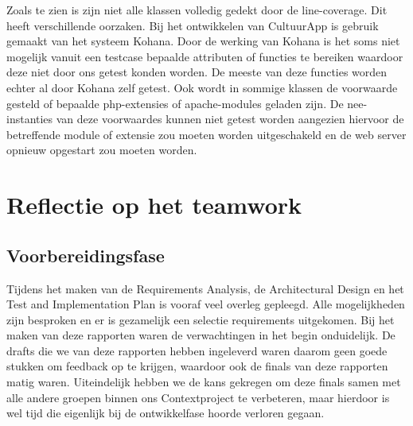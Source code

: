 \documentclass[a4paper,10pt]{article}
\begin{document}
Zoals te zien is zijn niet alle klassen volledig gedekt door de line-coverage. Dit heeft verschillende oorzaken. Bij het ontwikkelen van CultuurApp is gebruik gemaakt van het systeem Kohana. Door de werking van Kohana is het soms niet mogelijk vanuit een testcase bepaalde attributen of functies te bereiken waardoor deze niet door ons getest konden worden. De meeste van deze functies worden echter al door Kohana zelf getest. Ook wordt in sommige klassen de voorwaarde gesteld of bepaalde php-extensies of apache-modules geladen zijn. De nee-instanties van deze voorwaardes kunnen niet getest worden aangezien hiervoor de betreffende module of extensie zou moeten worden uitgeschakeld en de web server opnieuw opgestart zou moeten worden.
		
\section{Reflectie op het teamwork}

	\subsection{Voorbereidingsfase}
	Tijdens het maken van de Requirements Analysis, de Architectural Design en het Test and Implementation Plan is vooraf veel overleg gepleegd. Alle mogelijkheden zijn besproken en er is gezamelijk een selectie requirements uitgekomen. Bij het maken van deze rapporten waren de verwachtingen in het begin onduidelijk. De drafts die we van deze rapporten hebben ingeleverd waren daarom geen goede stukken om feedback op te krijgen, waardoor ook de finals van deze rapporten matig waren. Uiteindelijk hebben we de kans gekregen om deze finals samen met alle andere groepen binnen ons Contextproject te verbeteren, maar hierdoor is wel tijd die eigenlijk bij de ontwikkelfase hoorde verloren gegaan.
	
\end{document}
